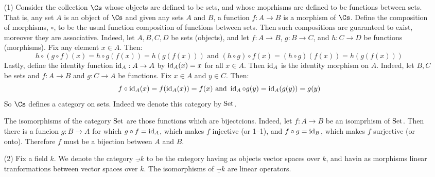 \begin{example}\label{example_1.1}
  \begin{enumerate}
    \item[(1)] Consider the collection $\Cs$ whose objects are defined
      to be sets, and whose moprhisms are defined to be functions
      between sets. That is, any set $A$ is an object of $\Cs$ and
      given any sets $A$ and $B$, a function $f:A \xrightarrow{} B$ is
      a morphism of $\Cs$. Define the composition of morphisms,
      $\circ$, to be the usual function composition of functions
      between sets. Then such compositions are guaranteed to exist,
      moreover they are associative. Indeed, let $A,B,C,D$ be sets
      (objects), and let $f:A \xrightarrow{} B$, $g: B \xrightarrow{}
      C$, and $h:C \xrightarrow{} D$ be functions (morphisms). Fix any
      element $x \in A$. Then:
      \begin{equation*}
        h \circ (g \circ f)(x)=h \circ g(f(x))=h(g(f(x))) \text{ and }
        (h \circ g) \circ f(x)=(h \circ g)(f(x))=h(g(f(x)))
      \end{equation*}
      Lastly, define the identity function $\operatorname{id}_A:A \xrightarrow{} A$
      by $\operatorname{id}_A(x)=x$ for all $x \in A$. Then $\operatorname{id}_A$ is the identity
      morphism on $A$. Indeed, let $B,C$ be sets and $f:A
      \xrightarrow{} B$ and $g:C \xrightarrow{} A$ be functions. Fix
      $x \in A$ and $y \in C$. Then:
      \begin{equation*}
        f \circ \operatorname{id}_A(x)=f(\operatorname{id}_A(x))=f(x) \text{ and }
        \operatorname{id}_A \circ g(y)=\operatorname{id}_A(g(y))=g(y)
      \end{equation*}
      So $\Cs$ defines a category on sets. Indeed we denote this
      category by $\operatorname{Set}$.

      The isomorphisms of the category $\operatorname{Set}$ are those functions
      which are bijectcions. Indeed, let $f:A \xrightarrow{} B$ be an
      isomprhism of $\operatorname{Set}$. Then there is a funcion $g:B
      \xrightarrow{} A$ for which $g \circ f=\operatorname{id}_A$, which makes $f$
      injective (or 1--1), and $f \circ g=\operatorname{id}_B$, which makes $f$
      surjective (or onto). Therefore $f$ must be a bijection between
      $A$ and $B$.

    \item[(2)] Fix a field $k$. We denote the category $\Vec_k$ to be
      the category having as objects vector spaces over $k$, and
      havin as morphisms linear tranformations between vector spaces
      over $k$. The isomorphisms of $\Vec_k$ are linear operators.


\end{enumerate}
\end{example}
